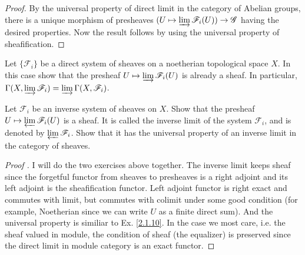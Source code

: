 \begin{proof}
	By the universal property of direct limit in the category of Abelian groups, there is a unique morphism of presheaves $(U\mapsto\varinjlim \mathscr{F}_{i}(U))\rightarrow\mathscr{G}$ having the desired properties. Now the result follows by using the universal property of sheafification.
\end{proof}
\begin{exe}
	\label{2.1.11}
	Let $\lbrace \mathscr{F}_{i}   \rbrace$ be a direct system of sheaves on a noetherian topological space $X$.  In this case show that the presheaf  $U \mapsto \varinjlim\mathscr{F}_{i}(U)$ is already a sheaf.  In particular,  $\Gamma(X,\varinjlim{\mathscr{F}_{i}})=\varinjlim{\Gamma(X,\mathscr{F}_{i})}$.
\end{exe}
\begin{exe}
	\label{2.1.12}
	Let ${\mathscr{F}_{i}}$ be an inverse system of sheaves on $X$.  Show that the presheaf $U \mapsto \varprojlim\mathscr{F}_{i}(U)$ is a sheaf.  It is called the inverse limit of the system ${\mathscr{F}_{i}}$,  and is denoted by $\varprojlim\mathscr{F}_{i}$.  Show that it has the universal property of an inverse limit in the category of sheaves.
\end{exe}
\begin{proof}[Proof \footnotemark]
	I will do the two exercises above together.  The inverse limit keeps sheaf since the forgetful functor from sheaves to presheaves is a right adjoint and its left adjoint is the sheafification functor.  Left adjoint functor is right exact and commutes with limit, but commutes with colimit under some good condition (for example,  Noetherian since we can write $U$ as a finite direct sum). And the universal property is similiar to Ex. \ref{2.1.10}.
	In the case we most care,  i.e.  the sheaf valued in module,  the condition of sheaf (the equalizer) is preserved since the direct limit in module category is an exact functor.
\end{proof}


